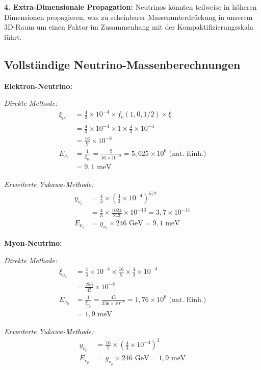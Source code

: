 \documentclass[12pt,a4paper]{article}
\begin{document}
	\textbf{4. Extra-Dimensionale Propagation:}
	Neutrinos könnten teilweise in höheren Dimensionen propagieren, was zu scheinbarer Massenunterdrückung in unserem 3D-Raum um einen Faktor im Zusammenhang mit der Kompaktifizierungsskala führt.
	
	\subsection{Vollständige Neutrino-Massenberechnungen}
	\label{subsec:neutrino_calculations}
	
	\textbf{Elektron-Neutrino:}
	
	\textit{Direkte Methode:}
	\begin{align}
		\xi_{\nu_e} &= \frac{4}{3} \times 10^{-4} \times f_e(1,0,1/2) \times \xi \\
		&= \frac{4}{3} \times 10^{-4} \times 1 \times \frac{4}{3} \times 10^{-4} \\
		&= \frac{16}{9} \times 10^{-8} \\
		E_{\nu_e} &= \frac{1}{\xi_{\nu_e}} = \frac{9}{16 \times 10^{-8}} = 5,625 \times 10^6 \text{ (nat. Einh.)} \\
		&= 9,1 \text{ meV}
	\end{align}
	
	\textit{Erweiterte Yukawa-Methode:}
	\begin{align}
		y_{\nu_e} &= \frac{4}{3} \times \left(\frac{4}{3} \times 10^{-4}\right)^{5/2} \\
		&= \frac{4}{3} \times \frac{1024}{243} \times 10^{-10} = 3,7 \times 10^{-11} \\
		E_{\nu_e} &= y_{\nu_e} \times 246 \text{ GeV} = 9,1 \text{ meV}
	\end{align}
	
	\textbf{Myon-Neutrino:}
	
	\textit{Direkte Methode:}
	\begin{align}
		\xi_{\nu_\mu} &= \frac{4}{3} \times 10^{-4} \times \frac{16}{5} \times \frac{4}{3} \times 10^{-4} \\
		&= \frac{256}{45} \times 10^{-8} \\
		E_{\nu_\mu} &= \frac{1}{\xi_{\nu_\mu}} = \frac{45}{256 \times 10^{-8}} = 1,76 \times 10^6 \text{ (nat. Einh.)} \\
		&= 1,9 \text{ meV}
	\end{align}
	
	\textit{Erweiterte Yukawa-Methode:}
	\begin{align}
		y_{\nu_\mu} &= \frac{16}{5} \times \left(\frac{4}{3} \times 10^{-4}\right)^3 \\
		E_{\nu_\mu} &= y_{\nu_\mu} \times 246 \text{ GeV} = 1,9 \text{ meV}
	\end{align}
	
\end{document}
